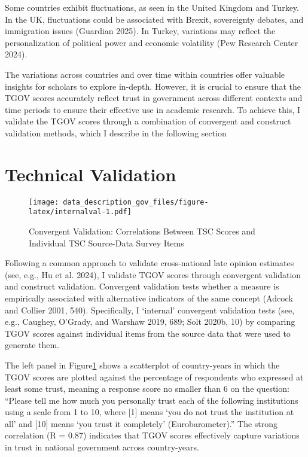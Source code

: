 \documentclass[
  12pt,
]{article}
\begin{document}
Some countries exhibit fluctuations, as seen in the United Kingdom and Turkey.
In the UK, fluctuations could be associated with Brexit, sovereignty debates, and immigration issues (Guardian 2025).
In Turkey, variations may reflect the personalization of political power and economic volatility (Pew Research Center 2024).

The variations across countries and over time within countries offer valuable insights for scholars to explore in-depth.
However, it is crucial to ensure that the TGOV scores accurately reflect trust in government across different contexts and time periods to ensure their effective use in academic research.
To achieve this, I validate the TGOV scores through a combination of convergent and construct validation methods, which I describe in the following section

\section{Technical Validation}\label{technical-validation}

\begin{figure}
\centering
\texttt{[image: data\_description\_gov\_files/figure-latex/internalval-1.pdf]}
\caption{\label{fig:internalval}Convergent Validation: Correlations Between TSC Scores and Individual TSC Source-Data Survey Items \label{internal_val}}
\end{figure}

Following a common approach to validate cross-national late opinion estimates (see, e.g., Hu et al. 2024), I validate TGOV scores through convergent validation and construct validation.
Convergent validation tests whether a measure is empirically associated with alternative indicators of the same concept (Adcock and Collier 2001, 540).
Specifically, I `internal' convergent validation tests (see, e.g., Caughey, O'Grady, and Warshaw 2019, 689; Solt 2020b, 10) by comparing TGOV scores against individual items from the source data that were used to generate them.

The left panel in Figure\nobreakspace{}\ref{internal_val} shows a scatterplot of country-years in which the TGOV scores are plotted against the percentage of respondents who expressed at least some trust, meaning a response score no smaller than 6 on the question: ``Please tell me how much you personally trust each of the following institutions using a scale from 1 to 10, where {[}1{]} means `you do not trust the institution at all' and {[}10{]} means `you trust it completely' (Eurobarometer).''
The strong correlation (R = 0.87) indicates that TGOV scores effectively capture variations in trust in national government across country-years.
\end{document}
